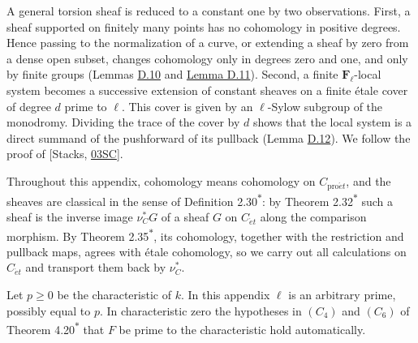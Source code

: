 \documentclass[11pt]{article}
\newcommand{\bpout}[1]{#1\textsuperscript{\hyperlink{bp-outside}{\ensuremath{\ast}}}}
\begin{document}
A general torsion sheaf is reduced to a constant one by two observations. First, a sheaf supported on finitely many points has no cohomology in positive degrees. Hence passing to the normalization of a curve, or extending a sheaf by zero from a dense open subset, changes cohomology only in degrees zero and one, and only by finite groups (Lemmas \hyperref[bp34]{D.10} and \hyperref[bp39]{Lemma D.11}). Second, a finite \(\mathbf F_\ell\)-local system becomes a successive extension of constant sheaves on a finite étale cover of degree \(d\) prime to \(\ell\). This cover is given by an \(\ell\)-Sylow subgroup of the monodromy. Dividing the trace of the cover by \(d\) shows that the local system is a direct summand of the pushforward of its pullback (Lemma \hyperref[bp44]{D.12}). We follow the proof of [Stacks, \href{https://stacks.math.columbia.edu/tag/03SC}{03SC}].

Throughout this appendix, cohomology means cohomology on \(C_{\mathrm{pro}\acute{e}t}\), and the sheaves are classical in the sense of Definition \bpout{2.30}: by Theorem \bpout{2.32} such a sheaf is the inverse image \(\nu_C^*G\) of a sheaf \(G\) on \(C_{\acute{e}t}\) along the comparison morphism. By Theorem \bpout{2.35}, its cohomology, together with the restriction and pullback maps, agrees with étale cohomology, so we carry out all calculations on \(C_{\acute{e}t}\) and transport them back by \(\nu_C^*\).

Let \(p\ge0\) be the characteristic of \(k\). In this appendix \(\ell\) is an arbitrary prime, possibly equal to \(p\). In characteristic zero the hypotheses in \((C_4)\) and \((C_6)\) of Theorem \bpout{4.20} that \(F\) be prime to the characteristic hold automatically.

\end{document}

